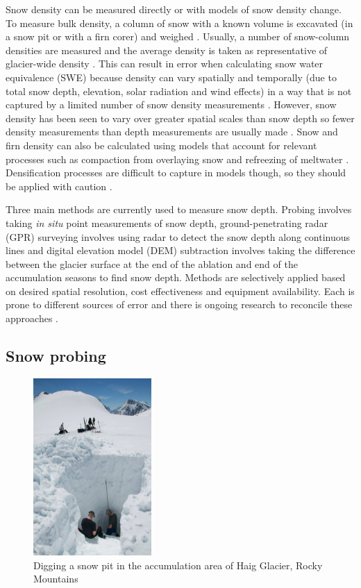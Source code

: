 \documentclass{sfuthesis}
\begin{document}
Snow density can be measured directly or with models of snow density change. To measure bulk density, a column of snow with a known volume is excavated (in a snow pit or with a firn corer) and weighed \citep{Sold2013, Sold2014}. Usually, a number of snow-column densities are measured and the average density is taken as representative of glacier-wide density \citep[e.g.][]{Machguth2006, Grunewald2010, McGrath2015}. This can result in error when calculating snow water equivalence (SWE) because density can vary spatially and temporally (due to total snow depth, elevation, solar radiation and wind effects) in a way that is not captured by a limited number of snow density measurements \citep{Grunewald2010, Wetlaufer2016}. However, snow density has been seen to vary over greater spatial scales than snow depth so fewer density measurements than depth measurements are usually made \citep{Elder1998, Clark2011}. Snow and firn density can also be calculated using models that account for relevant processes such as compaction from overlaying snow and refreezing of meltwater \citep{Herron1980, Sold2014}. Densification processes are difficult to capture in models though, so they should be applied with caution \citep{Mellor1974}.

Three main methods are currently used to measure snow depth. Probing involves taking \textit{in situ} point measurements of snow depth, ground-penetrating radar (GPR) surveying involves using radar to detect the snow depth along continuous lines and digital elevation model (DEM) subtraction involves taking the difference between the glacier surface at the end of the ablation and end of the accumulation seasons to find snow depth. Methods are selectively applied based on desired spatial resolution, cost effectiveness and equipment availability. Each is prone to different sources of error and there is ongoing research to reconcile these approaches \citep{Sold2014}.  

\subsection{Snow probing}
\label{snowprobing}
\begin{figure}
 \centering
      \includegraphics[width=0.4\textwidth]{snowpit.jpg}
  \caption{Digging a snow pit in the accumulation area of Haig Glacier, Rocky Mountains}
        \label{snowpit}
\end{figure}
\end{document}
